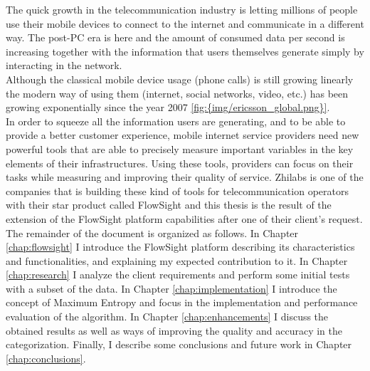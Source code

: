 
The quick growth in the telecommunication industry is letting millions of people use their mobile devices to connect to the internet and communicate in a different way. The post-PC era is here and
the amount of consumed data per second is increasing together with the information that users themselves generate simply by interacting in the network.\\
Although the classical mobile device usage (phone calls) is still growing linearly the modern way of using them (internet, social networks, video, etc.) has been growing exponentially since the year 
2007 \ref{fig:{img/ericsson_global.png}}.
 \\
In order to squeeze all the information users are generating, and to be able to provide a better customer experience, mobile internet service providers need new powerful tools that are able to precisely
measure important variables in the key elements of their infrastructures. Using these tools, providers can focus on their tasks while measuring and improving their quality of service.
Zhilabs is one of the companies that is building these kind of tools for telecommunication operators with their star product called FlowSight\cite{flowsight} and this thesis is the result of the 
extension of the FlowSight platform capabilities after one of their client's request.  \\ 
The remainder of the document is organized as follows. In Chapter \ref{chap:flowsight} I introduce the FlowSight platform describing its characteristics and functionalities, and explaining my
expected contribution to it. In Chapter \ref{chap:research} I analyze the client requirements and perform some initial tests with a subset of the data. In Chapter \ref{chap:implementation} I introduce
the concept of Maximum Entropy and focus in the implementation and performance evaluation of the algorithm. In Chapter \ref{chap:enhancements} I discuss the obtained results as well as ways of 
improving the quality and accuracy in the categorization. Finally, I describe some conclusions and future work in Chapter \ref{chap:conclusions}.

